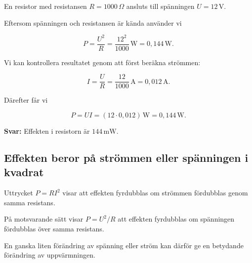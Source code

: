 \documentclass[
  swedish,
  11pt,
  a4paper,
  DIV=11,
  numbers=noendperiod,
  twoside,
  open=any]{scrreprt}
\begin{document}
\begin{tcolorbox}[enhanced jigsaw, arc=.35mm, bottomrule=.15mm, bottomtitle=1mm, breakable, colback=white, colbacktitle=quarto-callout-note-color!10!white, colframe=quarto-callout-note-color-frame, coltitle=black, left=2mm, leftrule=.75mm, opacityback=0, opacitybacktitle=0.6, rightrule=.15mm, title={Exempel: effekt i en resistor}, titlerule=0mm, toprule=.15mm, toptitle=1mm]

En resistor med resistansen \(R = 1000\,\Omega\) ansluts till spänningen
\(U = 12\,\mathrm{V}\).

Eftersom spänningen och resistansen är kända använder vi

\[
P = \frac{U^2}{R}
= \frac{12^2}{1000}\,\mathrm{W}
= 0{,}144\,\mathrm{W}.
\]

Vi kan kontrollera resultatet genom att först beräkna strömmen:

\[
I = \frac{U}{R}
= \frac{12}{1000}\,\mathrm{A}
= 0{,}012\,\mathrm{A}.
\]

Därefter får vi

\[
P = UI
= (12 \cdot 0{,}012)\,\mathrm{W}
= 0{,}144\,\mathrm{W}.
\]

\textbf{Svar:} Effekten i resistorn är \(144\,\mathrm{mW}\).

\end{tcolorbox}

\subsection{Effekten beror på strömmen eller spänningen i
kvadrat}\label{sec-effekt-effekten-beror-pa-strommen-eller-spanningen-i-kvadrat}

Uttrycket \(P = RI^2\) visar att effekten fyrdubblas om strömmen
fördubblas genom samma resistans.

På motsvarande sätt visar \(P = U^2/R\) att effekten fyrdubblas om
spänningen fördubblas över samma resistans.

En ganska liten förändring av spänning eller ström kan därför ge en
betydande förändring av uppvärmningen.
\end{document}
